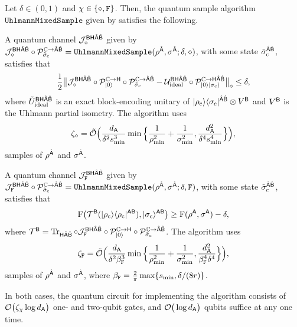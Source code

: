 \begin{theorem}
\label{thm:Uhlmann mixed state sample}
Let $\delta \in (0, 1)$ and $\chi \in \{\diamond, \mathtt{F}\}$. 
Then, the quantum sample algorithm $\mathtt{UhlmannMixedSample}$ given by  satisfies the following.

A quantum channel ${\mathcal{J}}_\diamond^{{\mathsf{B}}{\mathsf{H}}\hat{{\mathsf{A}}}\hat{{\mathsf{B}}}}$ given by ${\mathcal{J}}_\diamond^{{\mathsf{B}}{\mathsf{H}}\hat{{\mathsf{A}}}\hat{{\mathsf{B}}}}\circ{\mathcal{P}}_{\tilde{\sigma}_{\rm c}}^{\mathbb{C}\rightarrow\hat{{\mathsf{A}}}\hat{{\mathsf{B}}}}  
    =\mathtt{UhlmannMixedSample}(\rho^{\hat{{\mathsf{A}}}}, \sigma^{\hat{{\mathsf{A}}}}; \delta, \diamond)$,
with some state $\tilde{\sigma}_{\rm c}^{\hat{{\mathsf{A}}}\hat{{\mathsf{B}}}}$, satisfies that
\begin{equation}
    \frac{1}{2}\big\|{\mathcal{J}}_\diamond^{{\mathsf{B}}{\mathsf{H}}\hat{{\mathsf{A}}}\hat{{\mathsf{B}}}}\circ{\mathcal{P}}_{|0\rangle}^{\mathbb{C}\rightarrow{\mathsf{H}}}\circ{\mathcal{P}}_{\tilde{\sigma}_{\rm c}}^{\mathbb{C}\rightarrow\hat{{\mathsf{A}}}\hat{{\mathsf{B}}}} - {\mathcal{U}}_{\rm ideal}^{{\mathsf{B}}{\mathsf{H}}\hat{{\mathsf{A}}}\hat{{\mathsf{B}}}}\circ{\mathcal{P}}_{|0\rangle|\sigma_{\rm c}\rangle}^{\mathbb{C}\rightarrow{\mathsf{H}}\hat{{\mathsf{A}}}\hat{{\mathsf{B}}}}\big\|_\diamond \leq \delta,
\end{equation}
where $\tilde{U}_{\rm ideal}^{{\mathsf{B}}{\mathsf{H}}\hat{{\mathsf{A}}}\hat{{\mathsf{B}}}}$ is an exact block-encoding unitary of $|\rho_{\rm c}\rangle\langle\sigma_{\rm c}|^{\hat{{\mathsf{A}}}\hat{{\mathsf{B}}}} \otimes V^{\mathsf{B}}$ and $V^{\mathsf{B}}$ is the Uhlmann partial isometry.
The algorithm uses
\begin{align}
    \zeta_\diamond = \tilde{{\mathcal{O}}}\Big(\frac{d_{\mathsf{A}}}{\delta^2 s_{\rm min}^3} \min\Big\{\frac{1}{\rho_{\rm min}^2} + \frac{1}{\sigma_{\rm min}^2}, \frac{d_{\mathsf{A}}^2}{\delta^4 s_{\rm min}^4}\Big\}\Big),
\end{align}
samples of $\rho^{\hat{{\mathsf{A}}}}$ and $\sigma^{\hat{{\mathsf{A}}}}$.

A quantum channel ${\mathcal{J}}_{\mathtt{F}}^{{\mathsf{B}}{\mathsf{H}}\hat{{\mathsf{A}}}\hat{{\mathsf{B}}}}$ given by ${\mathcal{J}}_{\mathtt{F}}^{{\mathsf{B}}{\mathsf{H}}\hat{{\mathsf{A}}}\hat{{\mathsf{B}}}}\circ{\mathcal{P}}_{\tilde{\sigma}_{\rm c}}^{\mathbb{C}\rightarrow\hat{{\mathsf{A}}}\hat{{\mathsf{B}}}} 
    = \mathtt{UhlmannMixedSample}(\rho^{\hat{{\mathsf{A}}}}, \sigma^{\hat{{\mathsf{A}}}}; \delta, \mathtt{F})$,
with some state $\tilde{\sigma}_{\rm c}^{\hat{{\mathsf{A}}}\hat{{\mathsf{B}}}}$, satisfies that
\begin{align}
    {\mathrm{F}}\big({\mathcal{T}}^{\mathsf{B}}(|\rho_{\rm c}\rangle\langle\rho_{\rm c}|^{{\mathsf{A}}{\mathsf{B}}}), |\sigma_{\rm c}\rangle^{{\mathsf{A}}{\mathsf{B}}}\big) \geq {\mathrm{F}}(\rho^{\mathsf{A}}, \sigma^{\mathsf{A}}) - \delta,
\end{align}
where ${\mathcal{T}}^{{\mathsf{B}}}= \operatorname{Tr}_{{\mathsf{H}}\hat{{\mathsf{A}}}\hat{{\mathsf{B}}}}\circ{\mathcal{J}}_{\mathtt{F}}^{{\mathsf{B}}{\mathsf{H}}\hat{{\mathsf{A}}}\hat{{\mathsf{B}}}}\circ{\mathcal{P}}_{|0\rangle}^{\mathbb{C}\rightarrow{\mathsf{H}}}\circ{\mathcal{P}}_{\tilde{\sigma}_{\rm c}}^{\mathbb{C}\rightarrow\hat{{\mathsf{A}}}\hat{{\mathsf{B}}}}$.
The algorithm uses 
\begin{align}
    \zeta_{\mathtt{F}} = \tilde{{\mathcal{O}}}\Big(\frac{d_{\mathsf{A}}}{\delta^2\beta_{\mathtt{F}}^3}\min\Big\{\frac{1}{\rho_{\rm min}^2} + \frac{1}{\sigma_{\rm min}^2}, \frac{d_{\mathsf{A}}^2}{\beta_{\mathtt{F}}^4\delta^4}\Big\}\Big),
\end{align}
samples of $\rho^{\hat{{\mathsf{A}}}}$ and $\sigma^{\hat{{\mathsf{A}}}}$, where $\beta_{\mathtt{F}} = \frac{2}{\pi}\max\{s_{\rm min}, \delta/(8r)\}$.

In both cases, the quantum circuit for implementing the algorithm consists of ${\mathcal{O}}\big(\zeta_\chi \log{d_{\mathsf{A}}}\big)$ one- and two-qubit gates, and ${\mathcal{O}}\big(\log{d_{\mathsf{A}}}\big)$ qubits suffice at any one time. 
\end{theorem}




